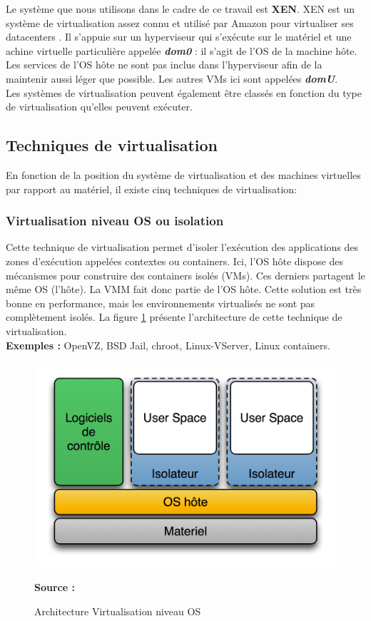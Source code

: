 Le système que nous utilisons dans le cadre de ce travail est \textbf{XEN}. XEN est un système de virtualisation assez connu \cite{article2} et utilisé par Amazon pour virtualiser ses datacenters \cite{online4}. Il s'appuie sur un hyperviseur qui s'exécute sur le matériel et une achine virtuelle particulière appelée \textit{\textbf{dom0}} : il s'agit de l'OS de la machine hôte. Les services de l'OS hôte ne sont pas inclus dans l'hyperviseur afin de la maintenir aussi léger que possible. Les autres VMs ici sont appelées \textit{\textbf{domU}}.\\
Les systèmes de virtualisation peuvent également être classés en fonction du type de virtualisation qu'elles peuvent exécuter.

\subsection{Techniques de virtualisation}
En fonction de la position du système de virtualisation et des machines virtuelles par rapport au matériel, il existe cinq techniques de virtualisation:

    \subsubsection{Virtualisation niveau OS ou isolation}
    Cette technique de virtualisation permet d'isoler l'exécution des applications des zones d'exécution appelées contextes ou containers. Ici, l'\acs{OS} hôte dispose des mécanismes pour construire des containers isolés (VMs). Ces derniers partagent le même OS (l'hôte). La \acs{VMM} fait donc partie de l'OS hôte. Cette solution est très bonne en performance, mais les environnements virtualisés ne sont pas complètement isolés. La figure \ref{fig:virtualisation_niveau_os} présente l'architecture de cette technique de virtualisation.
    \\ \textbf{Exemples :} OpenVZ,  BSD Jail, chroot, Linux-VServer, Linux containers.
    \begin{figure}[htp]
      \centering
      \includegraphics[scale=.8]{fig1/virtualisation_niveau_os.png}
      \caption{Architecture Virtualisation niveau OS}
      \label{fig:virtualisation_niveau_os}
      \centering \bfseries Source : \cite{online2}
    \end{figure}
    
